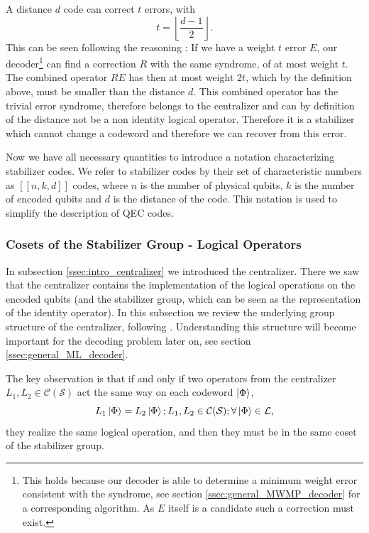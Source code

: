A distance $d$ code can correct $t$ errors, with 
\begin{equation}
    t =  \left \lfloor \frac{d-1}{2} \right \rfloor.
    \label{eq:correctable_errors}
\end{equation}
This can be seen following the reasoning \cite{terhal_qec_formalism}: 
If we have a weight $t$ error $E$, our decoder\footnote{
    This holds because our decoder is able to determine a minimum weight error consistent with the syndrome, see section \ref{ssec:general_MWMP_decoder} for a corresponding algorithm.
    As $E$ itself is a candidate such a correction must exist. 
} can find a correction $R$ with the same syndrome, of at most weight $t$.
The combined operator $RE$ has then at most weight $2t$, which by the definition above, must be smaller than the distance $d$.
This combined operator has the trivial error syndrome, therefore belongs to the centralizer and can by definition of the distance not be a non identity logical operator.
Therefore it is a stabilizer which cannot change a codeword and therefore we can recover from this error. 

Now we have all necessary quantities to introduce a notation characterizing stabilizer codes.
We refer to stabilizer codes by their set of characteristic numbers as $[[n,k,d]]$ codes, where $n$ is 
the number of physical qubits, $k$ is the number of encoded qubits and $d$ is the distance of the code.
This notation is used to simplify the description of QEC codes.

\subsubsection{Cosets of the Stabilizer Group - Logical Operators}

In subsection \ref{ssec:intro_centralizer} we introduced the centralizer. 
There we saw that the centralizer contains the implementation of the logical operations on the encoded qubits (and the stabilizer group, 
which can be seen as the representation of the identity operator).
In this subsection we review the underlying group structure of the centralizer, following \cite{gottesmann_book}.
Understanding this structure will become important for the decoding problem later on, see section \ref{ssec:general_ML_decoder}.


The key observation is that if and only if two operators from the centralizer $L_1, L_2 \in \mathcal{C}(\mathcal{S})$ act 
the same way on each codeword $\ket{\Phi}$, 
\begin{equation}
    L_1 \ket{\Phi}=L_2 \ket{\Phi}; L_1, L_2 \in \mathcal{C}(\mathcal{S}); \forall \ket{\Phi} \in \mathcal{L},
    \label{eq:two_logical_operators_acting_identical_on_all_codeword_states}
\end{equation}
they realize the same logical operation, 
and then they must be in the same coset of the stabilizer group.

